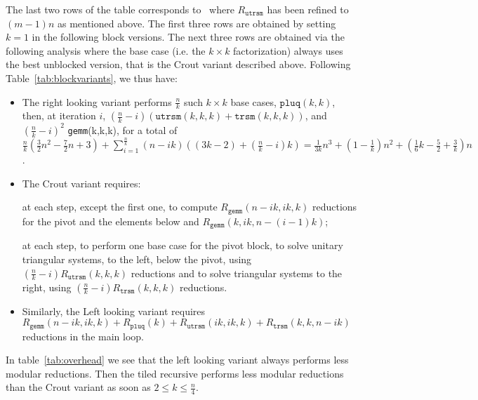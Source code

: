 \documentclass{article}
\newcommand{\gemm}{\texttt{gemm}\xspace}
\newcommand{\trsm}{\texttt{trsm}\xspace}
\newcommand{\utrsm}{\texttt{utrsm}\xspace}
\newcommand{\pluq}{\texttt{pluq}\xspace}
\begin{document}
The last two rows of the table corresponds
to~\cite[Theorem~4]{DPS13} where $R_\utrsm$ has been refined to $(m-1)n$ as mentioned above.
The first three rows are obtained by setting $k=1$ in the following block
versions. 
The next three rows are obtained via the following analysis
where the base case (i.e. the $k \times k$ factorization) always uses the best
unblocked version, that is the Crout variant described above.
Following Table~\ref{tab:blockvariants}, we thus have:
\begin{itemize}
\item The right looking variant performs $\frac{n}{k}$ such $k\times k$ base cases,
  $\pluq(k,k)$, then, at iteration $i$, $(\frac{n}{k}-i)(\utrsm(k,k,k)+\trsm(k,k,k))$,
  and $(\frac{n}{k}-i)^2$ \gemm(k,k,k), for a total of
  $\frac{n}{k}(\frac{3}{2}n^2-\frac{7}{2}n+3)+\sum_{i=1}^{\frac{n}{k}}
  (n-ik)\left((3k-2) + (\frac{n}{k}-i)k\right)=\frac{1}{3k}n^3+\left(1-\frac{1}{k}\right)n^2+\left(\frac{1}{6}k-\frac{5}{2}+\frac{3}{k}\right)n$.
\item The Crout variant requires:
 
 
      at each step, except the first one, to compute $R_{\gemm}(n-ik,ik,k)$
      reductions for the pivot and the elements below and
      $R_\gemm(k,ik,n-(i-1)k)$;
 
      at each step, to perform one base case for the pivot block, to
      solve unitary triangular systems, to the left, below the pivot, using
      $(\frac{n}{k}-i)R_\utrsm(k,k,k)$ reductions and to solve triangular systems to the
      right, using $(\frac{n}{k}-i)R_\trsm(k,k,k) $ reductions. 
 
\item Similarly, the Left looking variant requires $R_\gemm(n-ik, ik,
  k)+R_\pluq(k)+R_\utrsm(ik, ik,k)+R_\trsm(k,k,n-ik)$ reductions in the main loop.
\end{itemize}
 
 
 
 
 
 
 
 
 
 
 
 
 
 
 
 
 
 
 
 
In table~\ref{tab:overhead} we see that the left looking variant always performs less modular reductions. 
Then the tiled recursive performs less modular reductions than the Crout variant
as soon as $2\leq k \leq \frac{n}{4}$. 
 
\end{document}
